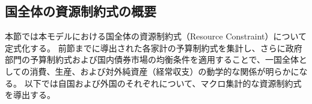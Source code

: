 
\subsection{国全体の資源制約式の概要}
\label{sec:chapter3_resource_constraints_overview}
本節では本モデルにおける国全体の資源制約式（Resource Constraint）について定式化する。
前節までに導出された各家計の予算制約式を集計し、さらに政府部門の予算制約式および国内債券市場の均衡条件を適用することで、一国全体としての消費、生産、および対外純資産（経常収支）の動学的な関係が明らかになる。
以下では自国および外国のそれぞれについて、マクロ集計的な資源制約式を導出する。